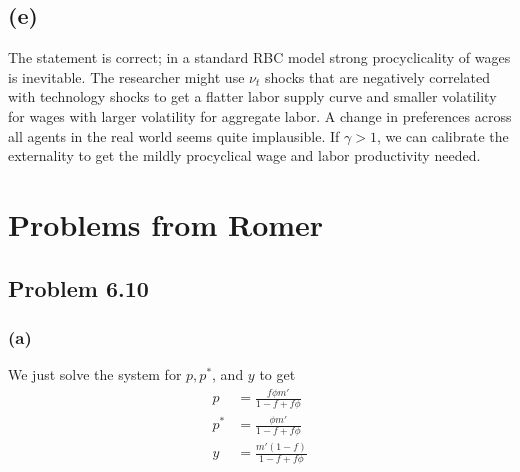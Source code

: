 \documentclass[12pt]{article}
\begin{document}
 \subsection*{(e)}
 The statement is correct; in a standard RBC model strong procyclicality of wages is inevitable. 
 The researcher might use $\nu_t$ shocks that are negatively correlated with technology shocks to get a flatter labor supply curve and smaller volatility for wages with larger volatility for aggregate labor. 
A change in preferences across all agents in the real world seems quite implausible.	If $\gamma > 1$, we can calibrate the externality to get the mildly procyclical wage and labor productivity needed. 


\section{Problems from Romer}
\subsection{Problem 6.10}

\subsubsection*{(a)} We just solve the system for $p, p^{*}$, and $y$ to get 
	\begin{align*}
	p & = \frac{f \phi m'}{1 - f + f\phi} \\
	p^{*} & = \frac{\phi m'}{1 - f + f\phi} \\
	y & = \frac{m' (1-f)}{1 - f + f\phi}
	\end{align*}
	
\end{document}
